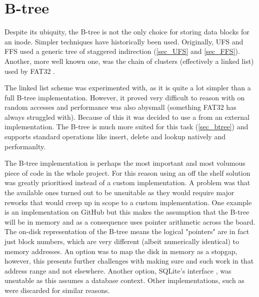     \section{B-tree}
        \label{sec_design_btree}

        Despite its ubiquity, the B-tree is not the only choice for storing
        data blocks for an inode. Simpler techniques have historically been
        used. Originally, UFS and FFS used a generic tree of staggered
        indirection (\ref{sec_UFS} and \ref{sec_FFS}). Another, more well known
        one, was the chain of clusters (effectively a linked list) used by
        FAT32 \cite{fat32}.

        The linked list scheme was experimented with, as it is quite a lot
        simpler than a full B-tree implementation. However, it proved very
        difficult to reason with on random accesses and performance was also
        abysmall (something FAT32 has always struggled with). Because of this
        it was decided to use a \bplustree from an external implementation. The
        B-tree is much more suited for this task (\ref{sec_btree}) and supports
        standard operations like insert, delete and lookup natively and
        performanlty.

        The B-tree implementation is perhaps the most important and most
        volumous piece of code in the whole project. For this reason using an
        off the shelf solution was greatly prioritised instead of a custom
        implementation. A problem was that the available ones turned out to be
        unsuitable as they would require major reworks that would creep up in
        scope to a custom implementation. One example is an implementation on
        GitHub \cite{GitHub_btree} but this makes the assumption that the
        B-tree will be in memory and as a consequence uses pointer arithmetic
        across the board. The on-disk representation of the B-tree means the
        logical "pointers" are in fact just block numbers, which are very
        different (albeit numerically identical) to memory addresses. An option
        was to map the disk in memory as a stopgap, however, this presents
        further challenges with making sure  and such work in
        that address range and not elsewhere. Another option, SQLite's
        interface \cite{SQLite_btree}, was unsutable as this assumes a database
        context. Other implementations, such as \cite{random_btree} were
        discarded for similar reasons.

